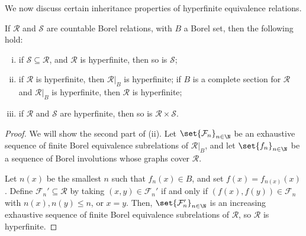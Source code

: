 \documentclass[10pt]{mypackage}
\begin{document}
We now discuss certain inheritance properties of hyperfinite equivalence relations.
\begin{proposition}
  If $\mathcal{R}$ and $\mathcal{S}$ are countable Borel relations, with $B$ a Borel set, then the following hold:
  \begin{enumerate}[(i)]
    \item if $\mathcal{S}\subseteq \mathcal{R}$, and $\mathcal{R}$ is hyperfinite, then so is $\mathcal{S}$;
    \item if $\mathcal{R}$ is hyperfinite, then $\mathcal{R}|_{B}$ is hyperfinite; if $B$ is a complete section for $\mathcal{R}$ and $\mathcal{R}|_{B}$ is hyperfinite, then $\mathcal{R}$ is hyperfinite;
    \item if $\mathcal{R}$ and $\mathcal{S}$ are hyperfinite, then so is $\mathcal{R}\times \mathcal{S}$.
  \end{enumerate}
\end{proposition}
\begin{proof}
  We will show the second part of (ii). Let $\set{\mathcal{F}_n}_{n\in \N}$ be an exhaustive sequence of finite Borel equivalence subrelations of $\mathcal{R}|_{B}$, and let $\set{f_n}_{n\in \N}$ be a sequence of Borel involutions whose graphs cover $\mathcal{R}$.

  Let $n(x)$ be the smallest $n$ such that $f_n(x) \in B$, and set $f(x) = f_{n(x)}(x)$. Define $\mathcal{F}_n'\subseteq \mathcal{R}$ by taking $\left( x,y \right)\in \mathcal{F}_n'$ if and only if $\left( f(x),f(y) \right)\in \mathcal{F}_n$ with $n(x),n(y)\leq n$, or $x = y$. Then, $\set{\mathcal{F}_n'}_{n\in \N}$ is an increasing exhaustive sequence of finite Borel equivalence subrelations of $\mathcal{R}$, so $\mathcal{R}$ is hyperfinite.
\end{proof}
\nocite{topics_in_orbit_equivalence,classical_descriptive_set_theory,operator_algebras_peterson,kerr_and_li}
\printbibliography
\end{document}
